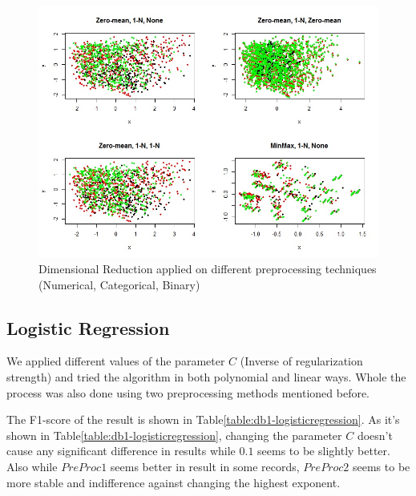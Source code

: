 \begin{figure}[p]
\center
\includegraphics[scale=\figurescaling]{figures/db1/dim_reduction.jpg}
\caption{Dimensional Reduction applied on different preprocessing techniques (Numerical, Categorical, Binary)
\label{fig:db1-dimred}}
\end{figure}


\subsection{Logistic Regression}
We applied different values of the parameter $C$ (Inverse of regularization strength) and tried the algorithm in both polynomial and linear ways. Whole the process was also done using two preprocessing methods mentioned before.

The F1-score of the result is shown in Table\ref{table:db1-logisticregression}. As it's shown in Table\ref{table:db1-logisticregression}, changing the parameter $C$ doesn't cause any significant difference in results while $0.1$ seems to be slightly better. Also while $PreProc1$ seems better in result in some records, $PreProc2$ seems to be more stable and indifference against changing the highest exponent.


